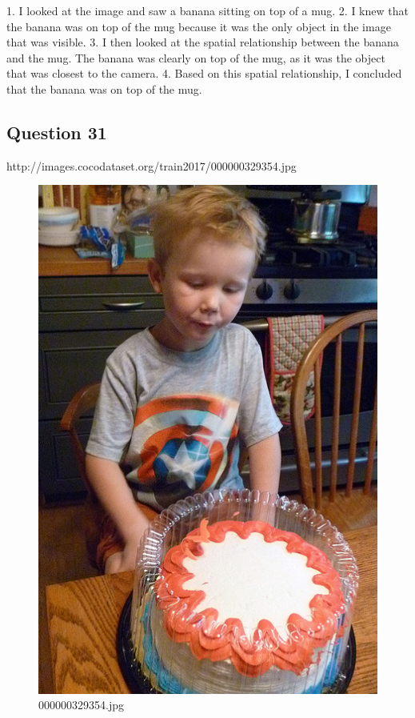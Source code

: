 \begin{enumerate}
        1. I looked at the image and saw a banana sitting on top of a mug.
        2. I knew that the banana was on top of the mug because it was the only object in the image that was visible.
        3. I then looked at the spatial relationship between the banana and the mug. The banana was clearly on top of the mug, as it was the object that was closest to the camera.
        4. Based on this spatial relationship, I concluded that the banana was on top of the mug.
    \end{enumerate}
    \subsection*{Question 31}
    http://images.cocodataset.org/train2017/000000329354.jpg
    \begin{figure}[h]
        \centering
        \includegraphics[width=0.8\linewidth]{../image set/easy/000000329354.jpg}
        \caption{000000329354.jpg}
    \end{figure}
